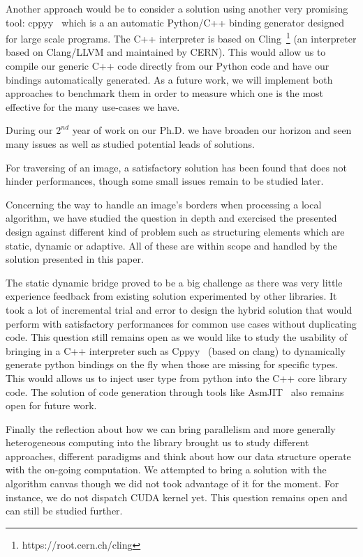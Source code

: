 Another approach would be to consider a solution using another very promising tool:
cppyy~\cite{wimtlplavrijsen.2016.cppyy} which is a an automatic Python/C++ binding generator designed for large scale
programs. The C++ interpreter is based on Cling~\footnote{https://root.cern.ch/cling} (an interpreter based on
Clang/LLVM and maintained by CERN). This would allow us to compile our generic C++ code directly from our Python code
and have our bindings automatically generated. As a future work, we will implement both approaches to benchmark them in
order to measure which one is the most effective for the many use-cases we have.

\vspace{1cm}

During our $2^{nd}$ year of work on our Ph.D. we have broaden our horizon and seen many issues as well as studied
potential leads of solutions.

For traversing of an image, a satisfactory solution has been found that does not hinder performances, though some small
issues remain to be studied later.

Concerning the way to handle an image's borders when processing a local algorithm, we have studied the question in depth
and exercised the presented design against different kind of problem such as structuring elements which are static,
dynamic or adaptive. All of these are within scope and handled by the solution presented in this paper.

The static dynamic bridge proved to be a big challenge as there was very little experience feedback from existing
solution experimented by other libraries. It took a lot of incremental trial and error to design the hybrid solution
that would perform with satisfactory performances for common use cases without duplicating code. This question still
remains open as we would like to study the usability of bringing in a C++ interpreter such as
Cppyy~\cite{wimtlplavrijsen.2016.cppyy} (based on clang) to dynamically generate python bindings on the fly when those
are missing for specific types. This would allows us to inject user type from python into the C++ core library code. The
solution of code generation through tools like AsmJIT~\cite{kobalicek.2011.asmjit} also remains open for future work.

Finally the reflection about how we can bring parallelism and more generally heterogeneous computing into the library
brought us to study different approaches, different paradigms and think about how our data structure operate with the
on-going computation. We attempted to bring a solution with the algorithm canvas though we did not took advantage of it
for the moment. For instance, we do not dispatch CUDA kernel yet. This question remains open and can still be studied
further.


